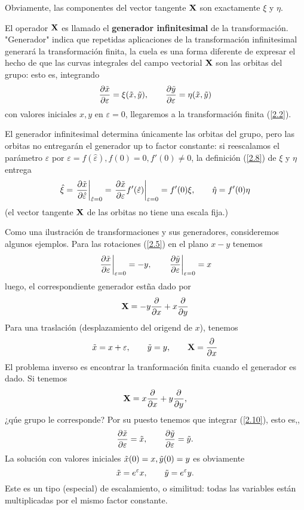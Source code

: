 Obviamente, las componentes del vector tangente $\vb{X}$ son exactamente $\xi$ y $\eta$.

El operador $\vb{X}$ es llamado el \textbf{generador infinitesimal} de la transformación. "Generador" indica que repetidas aplicaciones de la transformación infinitesimal generará la transformación finita, la cuela es una forma diferente de expresar el hecho de que las curvas integrales del campo vectorial $\vb{X}$ son las orbitas del grupo: esto es, integrando
\begin{equation}\label{2.10}
    \pdv{\Tilde{x}}{\varepsilon}=\xi(\Tilde{x},\Tilde{y}),\qquad  \pdv{\Tilde{y}}{\varepsilon}=\eta(\Tilde{x},\Tilde{y})
\end{equation}
con valores iniciales $x,y$ en $\varepsilon=0$, llegaremos a la transformación finita (\ref{2.2}).

El generador infinitesimal determina únicamente las orbitas del grupo, pero las orbitas no entregarán el generador up to factor constante: si reescalamos el parámetro $\varepsilon$ por $\varepsilon=f(\hat{\varepsilon}), f(0)=0,f'(0)\neq 0$, la definición (\ref{2.8}) de $\xi$ y $\eta$ entrega
\begin{equation}\label{2.11}
    \hat{\xi}=\eval{\pdv{\Tilde{x}}{\hat{\varepsilon}}}_{\hat{\varepsilon}=0}=\eval{\pdv{\Tilde{x}}{\varepsilon}f'(\hat{\varepsilon})}_{\varepsilon=0}=f'(0)\xi,\qquad \hat{\eta}=f'(0)\eta
\end{equation}
(el vector tangente $\vb{X}$ de las orbitas no tiene una escala fija.)

Como una ilustración de transformaciones y sus generadores, consideremos algunos ejemplos. Para las rotaciones (\ref{2.5}) en el plano $x-y$ tenemos
\begin{equation}
    \eval{\pdv{\Tilde{x}}{\varepsilon}}_{\varepsilon=0}=-y,\qquad \eval{\pdv{\Tilde{y}}{\varepsilon}}_{\varepsilon=0}=x
\end{equation}
luego, el correspondiente generador estña dado por
\begin{equation}\label{2.13}
    \vb{X}=-y\pdv{x}+x\pdv{y}
\end{equation}
Para una traslación (desplazamiento del origend de $x$), tenemos
\begin{equation}\label{2.14}
    \Tilde{x}=x+\varepsilon, \qquad \Tilde{y}=y,\qquad \vb{X}=\pdv{x}
\end{equation}
El problema inverso es encontrar la tranformación finita cuando el generador es dado. Si tenemos
\begin{equation}
    \vb{X}=x\pdv{x}+y\pdv{y},
\end{equation}
¿qúe grupo le corresponde? Por su puesto tenemos que integrar (\ref{2.10}), esto es,,
\begin{equation}
    \pdv{\Tilde{x}}{\varepsilon}=\Tilde{x},\qquad  \pdv{\Tilde{y}}{\varepsilon}=\Tilde{y}.
\end{equation}
La solución con valores iniciales $\Tilde{x}(0)=x,\Tilde{y}(0)=y$ es obviamente
\begin{equation}
    \Tilde{x}=e^\varepsilon x,\qquad \Tilde{y}=e^\varepsilon y.
\end{equation}
Este es un tipo (especial) de escalamiento, o similitud: todas las variables están multiplicadas por el mismo factor constante.

